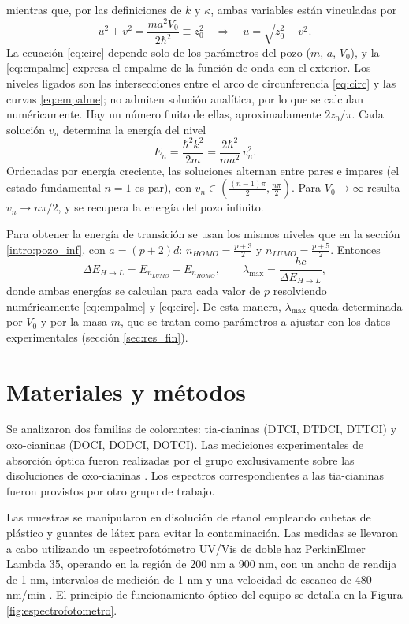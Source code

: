 \documentclass[12pt,a4paper,twocolumn]{informeUNLP} %
\begin{document}
mientras que, por las definiciones de $k$ y $\kappa$, ambas variables están vinculadas por
\begin{equation}
u^2+v^2=\frac{ma^2V_0}{2\hbar^2}\equiv z_0^2 \quad\Rightarrow\quad u=\sqrt{z_0^2-v^2}.
\label{eq:circ}
\end{equation}
La ecuación \eqref{eq:circ} depende solo de los parámetros del pozo ($m$, $a$, $V_0$), y la \eqref{eq:empalme} expresa el empalme de la función de onda con el exterior. Los niveles ligados son las intersecciones entre el arco de circunferencia \eqref{eq:circ} y las curvas \eqref{eq:empalme}; no admiten solución analítica, por lo que se calculan numéricamente. Hay un número finito de ellas, aproximadamente $2z_0/\pi$. Cada solución $v_n$ determina la energía del nivel
\begin{equation}
E_n=\frac{\hbar^2k^2}{2m}=\frac{2\hbar^2}{ma^2}\,v_n^2 .
\end{equation}
Ordenadas por energía creciente, las soluciones alternan entre pares e impares (el estado fundamental $n=1$ es par), con $v_n\in\left(\frac{(n-1)\pi}{2},\frac{n\pi}{2}\right)$. Para $V_0\to\infty$ resulta $v_n\to n\pi/2$, y se recupera la energía del pozo infinito.

Para obtener la energía de transición se usan los mismos niveles que en la sección \ref{intro:pozo_inf}, con $a=(p+2)d$: $n_{HOMO}=\frac{p+3}{2}$ y $n_{LUMO}=\frac{p+5}{2}$. Entonces
\[
\Delta E_{H\rightarrow L}=E_{n_{LUMO}}-E_{n_{HOMO}},\qquad \lambda_{\max}=\frac{hc}{\Delta E_{H\rightarrow L}},
\]
donde ambas energías se calculan para cada valor de $p$ resolviendo numéricamente \eqref{eq:empalme} y \eqref{eq:circ}. De esta manera, $\lambda_{\max}$ queda determinada por $V_0$ y por la masa $m$, que se tratan como parámetros a ajustar con los datos experimentales (sección \ref{sec:res_fin}).

\section{Materiales y métodos}

Se analizaron dos familias de colorantes: tia-cianinas (DTCI, DTDCI, DTTCI) y oxo-cianinas (DOCI, DODCI, DOTCI). Las mediciones experimentales de absorción óptica fueron realizadas por el grupo exclusivamente sobre las disoluciones de oxo-cianinas . Los espectros correspondientes a las  tia-cianinas fueron provistos por otro grupo de trabajo.

Las muestras se manipularon en disolución de etanol empleando cubetas de plástico y guantes de látex para evitar la contaminación. Las medidas se llevaron a cabo utilizando un espectrofotómetro UV/Vis de doble haz PerkinElmer Lambda 35, operando en la región de 200 nm a 900 nm, con un ancho de rendija de 1 nm, intervalos de medición de 1 nm y una velocidad de escaneo de 480 nm/min \cite{PerkinElmer}. El principio de funcionamiento óptico del equipo se detalla en la Figura \ref{fig:espectrofotometro}.
\end{document}
